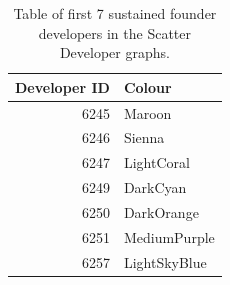 \begin{table}[H]
\centering
\caption{Table of first 7 sustained founder developers in the Scatter Developer graphs. } 
\label{tab:first_developers_21sustained_founder}
\begin{tabular}{rl}
\toprule
\textbf{Developer ID} & \textbf{Colour} \\ 
\midrule
6245 & \color{Maroon}Maroon \\ 
6246 & \color{Sienna}Sienna \\ 
6247 & \color{LightCoral}LightCoral \\ 
6249 & \color{DarkCyan}DarkCyan \\ 
6250 & \color{DarkOrange}DarkOrange \\ 
6251 & \color{MediumPurple}MediumPurple \\ 
6257 & \color{LightSkyBlue}LightSkyBlue \\ 
\bottomrule
\end{tabular}
\end{table}
\newpage 
